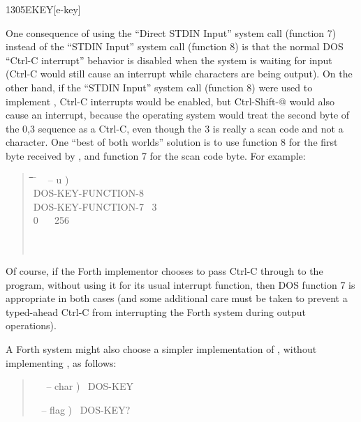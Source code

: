 \begin{worddef}{1305}{EKEY}[e-key]
\begin{defer}
		One consequence of using the ``Direct STDIN Input'' system call
		(function 7) instead of the ``STDIN Input'' system call
		(function 8) is that the normal DOS ``Ctrl-C interrupt'' behavior
		is disabled when the system is waiting for input (Ctrl-C would
		still cause an interrupt while characters are being output). On
		the other hand, if the ``STDIN Input'' system call (function 8)
		were used to implement , Ctrl-C interrupts would be
		enabled, but Ctrl-Shift-@ would also cause an interrupt, because
		the operating system would treat the second byte of the 0,3
		sequence as a Ctrl-C, even though the 3 is really a scan code
		and not a character. One ``best of both worlds'' solution is to
		use function 8 for the first byte received by , and
		function 7 for the scan code byte. For example:

		\begin{quote}
			\ttfamily
			\begin{tabbing}
			\tab \= \tab \= \tab \= \tab \= \hspace{7em} \= \kill
			\+ \word{:} ~  -- u ) \\
				\+ DOS-KEY-FUNCTION-8~ ~ ~  \\
					DOS-KEY-FUNCTION-7~  3~ \word{=}~  \\
					\>  0~ ~ 256 \word{+}\\
				\- \word{THEN} \\
			\-  \\
			\word{;}
			\end{tabbing}
		\end{quote}

		Of course, if the Forth implementor chooses to pass Ctrl-C
		through to the program, without using it for its usual
		interrupt function, then DOS function 7 is appropriate in both
		cases (and some additional care must be taken to prevent a
		typed-ahead Ctrl-C from interrupting the Forth system during
		output operations).

		A Forth system might also choose a simpler implementation of
		, without implementing , as follows:

		\begin{quote}\ttfamily
			\word{:} ~~  -- char )~
				DOS-KEY~
			\word{;}

			\word{:} ~  -- flag )~
				DOS-KEY?~ ~
			\word{;}
		\end{quote}


\end{defer}
\end{worddef}
